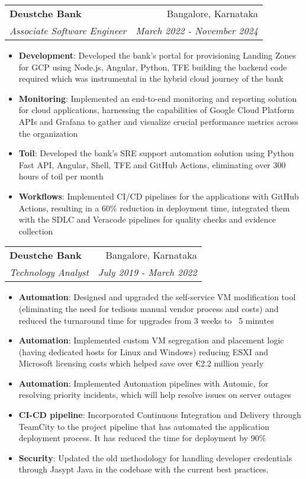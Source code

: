 \documentclass[letterpaper,11pt]{article}
\makeatletter
\newcommand{\resumeItem}[2]{
  \item\small{
    \textbf{#1}{: #2 \vspace{-2pt}}
  }
}
\newcommand{\resumeSubheading}[4]{
  \vspace{-1pt}\item
    \begin{tabular*}{0.97\textwidth}[t]{l@{\extracolsep{\fill}}r}
      \textbf{#1} & #2 \\
      \textit{\small#3} & \textit{\small #4} \\
    \end{tabular*}\vspace{-5pt}
}
\newcommand{\resumeItemListStart}{\begin{itemize}}
\newcommand{\resumeItemListEnd}{\end{itemize}\vspace{-5pt}}
\makeatother
\begin{document}
    \resumeSubheading
      {Deustche Bank}{Bangalore, Karnataka}
      {Associate Software Engineer}{March 2022 - November 2024}
      \resumeItemListStart
        \resumeItem{Development}
          {Developed the bank's portal for provisioning Landing Zones for GCP using Node.js, Angular, Python, TFE building the backend code required which was instrumental in the hybrid cloud journey of the bank}
        \resumeItem{Monitoring}
          {Implemented an end-to-end monitoring and reporting solution for cloud applications, harnessing the capabilities of Google Cloud Platform APIs and Grafana to gather and visualize crucial performance metrics across the organization}     
        \resumeItem{Toil}
          {Developed the bank's SRE support automation solution using Python Fast API, Angular, Shell, TFE and GitHub Actions, eliminating over 300 hours of toil per month}
        \resumeItem{Workflows}
          {Implemented CI/CD pipelines for the applications with GitHub Actions, resulting in a 60\% reduction in deployment time, integrated them with the SDLC and Veracode pipelines for quality checks and evidence collection}
      \resumeItemListEnd
       

    \resumeSubheading
      {Deustche Bank}{Bangalore, Karnataka}
      {Technology Analyst}{July 2019 - March 2022}
      \resumeItemListStart
        \resumeItem{Automation}
          {Designed and upgraded the self-service VM modification tool (eliminating the need for tedious manual vendor process and costs) and reduced the turnaround time for upgrades from 3 weeks to ~5 minutes} 
        \resumeItem{Automation}
          {Implemented custom VM segregation and placement logic (having dedicated hosts for Linux and Windows) reducing ESXI and Microsoft licensing costs which helped save over €2.2 million yearly} 
        \resumeItem{Automation}
          {Implemented Automation pipelines with Automic, for resolving priority incidents, which will help resolve issues on server outages} 
        \resumeItem{CI-CD pipeline}
          {Incorporated Continuous Integration and Delivery through TeamCity to the project pipeline that has automated the application deployment process. It has reduced the time for deployment by 90\%}
        \resumeItem{Security}
          {Updated the old methodology for handling developer credentials through Jasypt Java in the codebase with the current best practices.}
      \resumeItemListEnd

\end{document}
